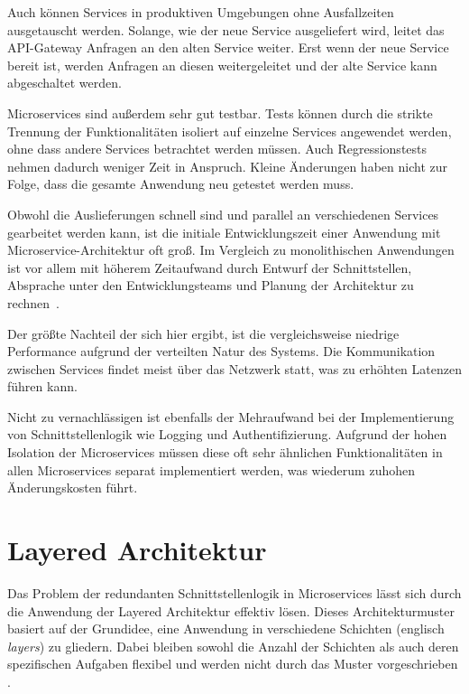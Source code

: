 \documentclass[acmtog]{acmart}
\begin{document}
Auch können Services in produktiven Umgebungen ohne Ausfallzeiten ausgetauscht werden.
Solange, wie der neue Service ausgeliefert wird, leitet das API-Gateway Anfragen an den alten Service weiter.
Erst wenn der neue Service bereit ist, werden Anfragen an diesen weitergeleitet und der alte Service kann abgeschaltet werden.

Microservices sind außerdem sehr gut testbar.
Tests können durch die strikte Trennung der Funktionalitäten isoliert auf einzelne Services angewendet werden, ohne dass andere Services betrachtet werden müssen.
Auch Regressionstests nehmen dadurch weniger Zeit in Anspruch.
Kleine Änderungen haben nicht zur Folge, dass die gesamte Anwendung neu getestet werden muss.

Obwohl die Auslieferungen schnell sind und parallel an verschiedenen Services gearbeitet werden kann, ist die initiale Entwicklungszeit einer Anwendung mit Microservice-Architektur oft groß.
Im Vergleich zu monolithischen Anwendungen ist vor allem mit höherem Zeitaufwand durch Entwurf der Schnittstellen, Absprache unter den Entwicklungsteams und Planung der Architektur zu rechnen~\cite[6-7]{evolutionOfDistributedSystems}.

Der größte Nachteil der sich hier ergibt, ist die vergleichsweise niedrige Performance aufgrund der verteilten Natur des Systems.
Die Kommunikation zwischen Services findet meist über das Netzwerk statt, was zu erhöhten Latenzen führen kann\cite[34]{architecturePatterns}.

Nicht zu vernachlässigen ist ebenfalls der Mehraufwand bei der Implementierung von Schnittstellenlogik wie Logging und Authentifizierung.
Aufgrund der hohen Isolation der Microservices müssen diese oft sehr ähnlichen Funktionalitäten in allen Microservices separat implementiert werden, was
wiederum zuhohen Änderungskosten führt.

\section{Layered Architektur}
\label{sec:layered}
Das Problem der redundanten Schnittstellenlogik in Microservices lässt sich durch die
Anwendung der Layered Architektur effektiv lösen. Dieses Architekturmuster basiert auf
der Grundidee, eine Anwendung in verschiedene Schichten (englisch \textit{layers})
zu gliedern. Dabei bleiben sowohl die Anzahl der Schichten als auch deren spezifischen
Aufgaben flexibel und werden nicht durch das Muster vorgeschrieben \cite[34]{layered2}.
\end{document}
